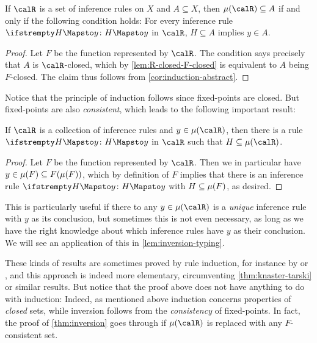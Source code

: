 \begin{theorem}
    \label{thm:rule-induction}
    If $\calR$ is a set of inference rules on $X$ and $A \subseteq X$, then $\lfp{\calR} \subseteq A$ if and only if the following condition holds: For every inference rule $\myinfrule{}{H}{y}$ in $\calR$, $H \subseteq A$ implies $y \in A$.
\end{theorem}

\begin{proof}
    Let $F$ be the function represented by $\calR$. The condition says precisely that $A$ is $\calR$-closed, which by \cref{lem:R-closed-F-closed} is equivalent to $A$ being $F$-closed. The claim thus follows from \cref{cor:induction-abstract}.
\end{proof}

 Notice that the principle of induction follows since fixed-points are closed. But fixed-points are also \emph{consistent}, which leads to the following important result:

\begin{theorem}[Inversion]
    \label{thm:inversion}
    If $\calR$ is a collection of inference rules and $y \in \lfp{\calR}$, then there is a rule $\myinfrule{}{H}{y}$ in $\calR$ such that $H \subseteq \lfp{\calR}$.
\end{theorem}

\begin{proof}
    Let $F$ be the function represented by $\calR$. Then we in particular have $y \in \lfp{F} \subseteq F(\lfp{F})$, which by definition of $F$ implies that there is an inference rule $\myinfrule{}{H}{y}$ with $H \subseteq \lfp{F}$, as desired.
\end{proof}
%
This is particularly useful if there to any $y \in \lfp{\calR}$ is a \emph{unique} inference rule with $y$ as its conclusion, but sometimes this is not even necessary, as long as we have the right knowledge about which inference rules have $y$ as their conclusion. We will see an application of this in \cref{lem:inversion-typing}.

These kinds of results are sometimes proved by rule induction, for instance by \textcite[§7.2]{pitts-nominal-sets} or \textcite[Lemma~4.2]{harper-pl}, and this approach is indeed more elementary, circumventing \cref{thm:knaster-tarski} or similar results. But notice that the proof above does not have anything to do with induction: Indeed, as mentioned above induction concerns properties of \emph{closed} sets, while inversion follows from the \emph{consistency} of fixed-points. In fact, the proof of \cref{thm:inversion} goes through if $\lfp{\calR}$ is replaced with any $F$-consistent set.

